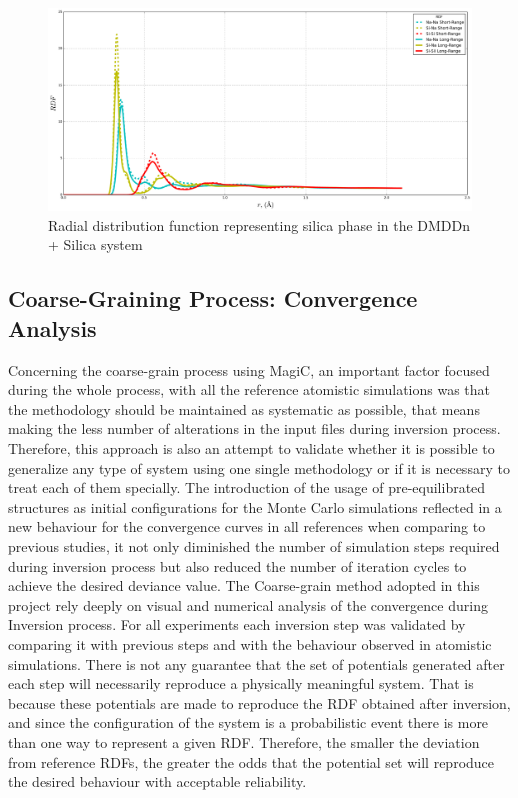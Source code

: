 \documentclass[10pt,a4paper,twoside]{article}
\begin{document}
\begin{figure}[H]
  \begin{center}
	\includegraphics[width=1 \textwidth]{./graphs/rdfaa3}
	\caption{Radial distribution function representing silica phase in the DMDDn + Silica system}
	\label{Fig:rdfAA3}
  \end{center}
\end{figure}

\subsection{Coarse-Graining Process: Convergence Analysis}
 \label{sec:expMagic}
Concerning the coarse-grain process using MagiC, an important factor focused during the whole process, with all the reference atomistic simulations was that the methodology should be maintained as systematic as possible, that means making the less number of alterations in the input files during inversion process. Therefore, this approach is also an attempt to validate whether it is possible to generalize any type of system using one single methodology or if it is necessary to treat each of them specially. The introduction of the usage of pre-equilibrated structures as initial configurations for the Monte Carlo simulations reflected in a new behaviour for  the convergence curves in all references when comparing to previous studies, it not only diminished the number of simulation steps required during  inversion process but also reduced the number of iteration cycles to achieve the desired deviance value.
The Coarse-grain method adopted in this project rely deeply on visual and numerical analysis of the convergence during Inversion process. For all experiments each inversion step was validated by comparing it with previous steps and with the behaviour observed in atomistic simulations. There is not any guarantee that the set of potentials generated after each step will necessarily reproduce a physically meaningful system.  That is because these potentials are made to reproduce the RDF obtained after inversion, and since the configuration of the system is a probabilistic event there is more than one way to represent a given RDF. Therefore, the smaller the deviation from reference RDFs, the greater the odds that the potential set will reproduce the desired behaviour with acceptable reliability. 
\end{document}
